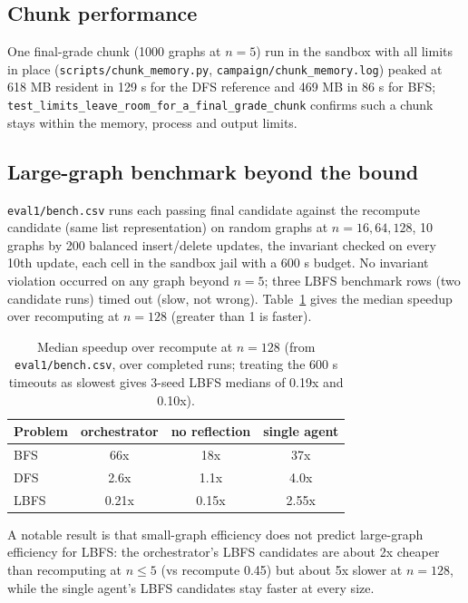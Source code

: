 \subsection{Chunk performance}

One final-grade chunk (1000 graphs at $n = 5$) run in the sandbox with all
limits in place (\texttt{scripts/chunk\_memory.py},
\texttt{campaign/chunk\_memory.log}) peaked at 618 MB resident in 129 s for the
DFS reference and 469 MB in 86 s for BFS;
\texttt{test\_limits\_leave\_room\_for\_a\_final\_grade\_chunk} confirms such a
chunk stays within the memory, process and output limits.

\subsection{Large-graph benchmark beyond the bound}

\texttt{eval1/bench.csv} runs each passing final candidate against the
recompute candidate (same list representation) on random graphs at
$n = 16, 64, 128$, 10 graphs by 200 balanced insert/delete updates, the
invariant checked on every 10th update, each cell in the sandbox jail with a
600 s budget. No invariant violation occurred on any graph beyond $n = 5$;
three LBFS benchmark rows (two candidate runs) timed out (slow, not wrong). Table~\ref{tab:bench} gives the
median speedup over recomputing at $n = 128$ (greater than 1 is faster).

\begin{table}[H]
\centering
\footnotesize
\caption{Median speedup over recompute at $n = 128$ (from
\texttt{eval1/bench.csv}, over completed runs; treating the 600 s timeouts as
slowest gives 3-seed LBFS medians of 0.19x and 0.10x).}
\label{tab:bench}
\begin{tabular}{@{}lccc@{}}
\toprule
Problem & orchestrator & no reflection & single agent \\
\midrule
BFS & 66x & 18x & 37x \\
DFS & 2.6x & 1.1x & 4.0x \\
LBFS & 0.21x & 0.15x & 2.55x \\
\bottomrule
\end{tabular}
\end{table}

A notable result is that small-graph efficiency does not predict large-graph
efficiency for LBFS: the orchestrator's LBFS candidates are about 2x cheaper
than recomputing at $n \le 5$ (vs recompute 0.45) but about 5x slower at
$n = 128$, while the single agent's LBFS candidates stay faster at every size.

